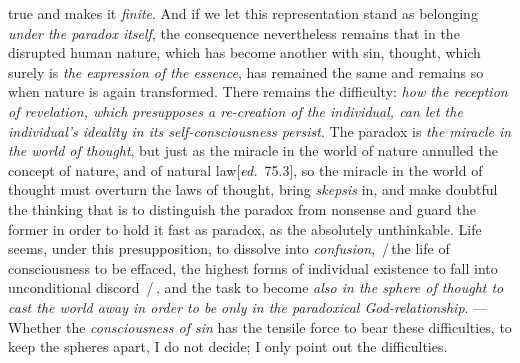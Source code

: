 \documentclass[12pt,a4paper,openany]{book}
\newcommand{\ed}[1]{{\small[\textit{ed.}\ #1]}}
\newcommand{\ins}[1]{\,/\,#1\,/\,}
\begin{document}
true and makes it \emph{finite}. And if we let this representation stand as
belonging \emph{under the paradox itself}, the consequence nevertheless remains
that in the disrupted human nature, which has become another
with sin, thought, which surely is \emph{the expression of the essence}, has remained the
same and remains so when nature is again transformed. There remains the
difficulty: \emph{how the reception of revelation, which presupposes a re-creation
of the individual, can let the individual's ideality in its self-consciousness persist}.
The paradox is \emph{the miracle in the world of thought}, but just as the miracle in the world
of nature annulled the concept of nature, and of natural law\ed{75.3}, so
the miracle in the world of thought must overturn the laws of thought, bring
\emph{skepsis} in, and make doubtful the thinking that is to distinguish the paradox
from nonsense and guard the former in order to hold it fast as paradox,
as the absolutely unthinkable. Life seems, under this presupposition,
to dissolve into \emph{confusion}, \ins{the life of consciousness to be effaced, the
highest forms of individual existence to fall into unconditional discord
}, and the task to become \emph{also in the sphere of thought to cast the world away in order to
be only in the paradoxical God-relationship}. --- Whether the \emph{consciousness of sin} has the tensile force
to bear these difficulties, to keep the spheres apart, I do
not decide; I only point out the difficulties.
\end{document}
